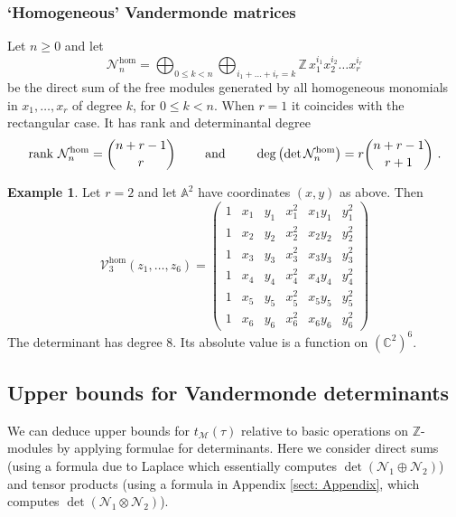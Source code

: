 \documentclass[a4paper,10pt]{amsart}
\theoremstyle{definition}
\newtheorem{example}[thm]{Example}
\theoremstyle{remark}
\numberwithin{equation}{section}
\newcommand{\Z}{\mathbb Z}
\newcommand{\C}{\mathbb C}
\newcommand{\rank}{\mathrm{rank}}
\newcommand{\0}{\color{blue}{\mathsf{0}}}
\begin{document}
  \subsubsection{`Homogeneous' Vandermonde matrices}  \label{sect: homVdM}  Let $n\geq 0$ and let
  \[ \mathcal{N}_n^{\mathrm{hom}} =  \bigoplus_{0\leq k < n} \bigoplus_{ i_1 +\ldots + i_r =k}  \Z\,   x_1^{i_1} x_2^{i_2} \ldots x_r^{i_r} \]
  be the direct sum of the free modules generated by all homogeneous monomials  in  $x_1,\ldots, x_r$ of degree $k$, for $0 \leq k <  n$. 
  When $r=1$ it coincides with  the rectangular case.
   It has rank  and determinantal degree 
  \begin{equation}
  \label{degree:hom}
        \rank  \, \, \mathcal{N}_n^{\mathrm{hom}}  = \binom{n+r-1}{r} \qquad \hbox{ and } \qquad   \deg  \left(\det  \mathcal{N}_n^{\mathrm{hom}} \right) =r  \binom{n+r-1}{r+1} \ .
    \end{equation} 
\begin{example} Let $r=2$ and let $\mathbb{A}^2$ have coordinates $(x,y)$ as above. Then 
\[ \mathcal{V}^{\mathrm{hom}}_{3}(z_1,\ldots, z_6) =  \begin{pmatrix}  1 & x_1 & y_1 &   x_1^2 &  x_1y_1 &  y^2_1  \\
1 & x_2 &  y_2 & x_2^2&  x_2y_2 &  y^2_2\\
1 & x_3 &  y_3 &  x_3^2& x_3y_3 &  y^2_3\\
1 & x_4 &  y_4 &  x_4^2&x_4y_4 &  y^2_4\\
1 & x_5 &  y_5 &x_5^2 &x_5y_5 &   y^2_5\\
1 & x_6 &  y_6 &x_6^2  & x_6y_6 &  y^2_6
\end{pmatrix}
\]
The determinant has degree $8$.
Its  absolute value  is a  function on $(\C^2)^6$.


\end{example}

  
  
  
  \subsection{Upper bounds for Vandermonde determinants}
  We can deduce  upper bounds for  $t_{\mathcal{M}}(\tau)$ relative to basic operations on $\Z$-modules by applying formulae for determinants.
 Here we consider direct sums (using a formula due to Laplace which essentially computes $\det ( \mathcal{N}_1 \oplus \mathcal{N}_2 )$) and tensor products (using a formula in Appendix \ref{sect: Appendix}, which  computes  $\det ( \mathcal{N}_1 \otimes \mathcal{N}_2 )$). 
  
\end{document}
